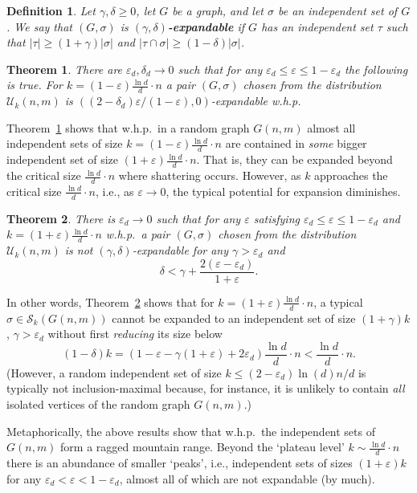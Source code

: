 \documentclass[a4paper,10pt]{article}
\newtheorem{definition}{Definition}\renewcommand{\thedefinition}{\arabic{definition}}
\newtheorem{theorem}{Theorem}\renewcommand{\thetheorem}{\arabic{theorem}}
\newcommand\cU{\mathcal{U}}
\newcommand\cS{\mathcal{S}}
\newcommand\eps{\varepsilon}
\newcommand\ra{\rightarrow}
\newcommand{\whp}{w.h.p.}
\newcommand\Thm{Theorem}
\begin{document}
\begin{definition}
Let $\gamma,\delta\geq0$, let $G$ be a graph, and let $\sigma$ be
an independent set of $G$. We say that $(G,\sigma)$ is {\bf $(\gamma,
\delta)$-expandable} if $G$ has an independent set $\tau$ such that 
$|\tau|\geq (1+\gamma)|\sigma|$ and
$|\tau \cap \sigma|\geq(1-\delta)|\sigma|$.
\end{definition}


\begin{theorem}\label{theorem:non-maximal}
There are $\eps_d, \delta_d\ra0$ such that for any $\eps_d\leq \eps\leq1-\eps_d$
the following is true. For 	$k=(1-\eps)\frac{\ln d}d\cdot n$ a
pair $(G,\sigma)$ chosen from the distribution $\cU_k(n,m)$ is
$((2-\delta_d)\eps/(1-\eps),0)$-expandable \whp
\end{theorem}


\noindent
\Thm~\ref{theorem:non-maximal} shows that  \whp\ in a random graph
$G(n,m)$ almost all independent sets of size $k=(1-\eps)\frac{\ln d}
d\cdot n$ are contained in \emph{some} bigger independent set of size
$(1+\eps)\frac{\ln d}d\cdot n$. That is, they can be expanded beyond
the critical size $\frac{\ln d} d\cdot n$ where shattering occurs.
However, as $k$ approaches the critical size $\frac{\ln d}d\cdot n$,
i.e., as $\eps\ra0$, the typical potential for expansion diminishes.


\begin{theorem}\label{theorem:maximal}
There is $\eps_d\ra0$ such that for any $\eps$ satisfying $\eps_d\leq \eps\leq1-\eps_d$
and 	$k=(1+\eps)\frac{\ln d}d\cdot n$ \whp\ a pair $(G,\sigma)$
chosen from the distribution $\cU_k(n,m)$ is not $(\gamma,\delta)$-expandable
for any $\gamma>\eps_d$ and 
$$\delta<\gamma+\frac{2(\eps-\eps_d)}{1+\eps}.$$
\end{theorem}

\noindent
In other words, \Thm~\ref{theorem:maximal} shows that for $k=
(1+\eps)\frac{\ln d}d\cdot n$, a typical $\sigma\in\cS_k(G(n,m))$
cannot be expanded to an independent set of size $(1+\gamma)k$,
$\gamma>\eps_d$ without first \emph{reducing} its size below 
$$(1-\delta)k=(1-\eps-\gamma(1+\eps)+2\eps_d)\frac{\ln d}d\cdot
n<\frac{\ln d}d\cdot n.$$ (However,  a random independent set of
size $k\leq(2-\eps_d)\ln(d)n/d$ is typically not inclusion-maximal
because, for instance, it is unlikely to contain \emph{all} isolated
vertices of the random graph $G(n,m)$.)


Metaphorically, the above results show that \whp\ the independent sets of $G(n,m)$ form 
a ragged mountain range.
 Beyond the `plateau level'
$k\sim\frac{\ln d}d\cdot n$ there is an abundance of smaller `peaks',
i.e., independent sets of sizes $(1+\eps)k$ for any $\eps_d<\eps<1-\eps_d$,
almost all of which are
not expandable (by much).
\end{document}
